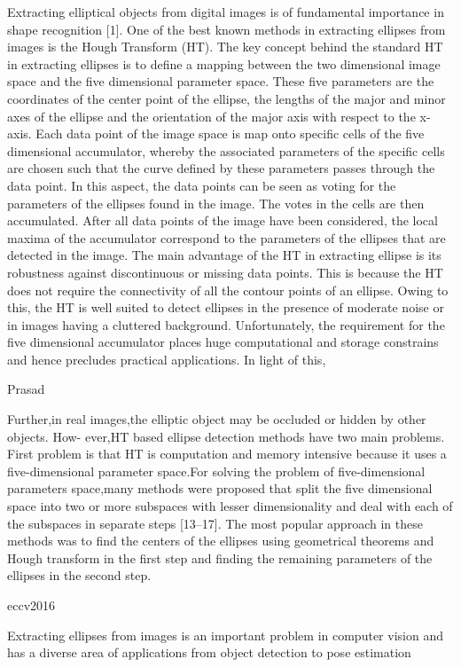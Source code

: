 \documentclass[a4paper]{report}
\begin{document}
Extracting elliptical objects from digital images is of fundamental
importance in shape recognition [1]. One of the best known methods
in extracting ellipses from images is the Hough Transform (HT).
The key concept behind the standard HT in extracting ellipses is to
define a mapping between the two dimensional image space and the
five dimensional parameter space. These five parameters are the coordinates
of the center point of the ellipse, the lengths of the major
and minor axes of the ellipse and the orientation of the major axis
with respect to the x-axis. Each data point of the image space is map
onto specific cells of the five dimensional accumulator, whereby the
associated parameters of the specific cells are chosen such that the
curve defined by these parameters passes through the data point. In
this aspect, the data points can be seen as voting for the parameters
of the ellipses found in the image. The votes in the cells are then accumulated.
After all data points of the image have been considered,
the local maxima of the accumulator correspond to the parameters
of the ellipses that are detected in the image.
The main advantage of the HT in extracting ellipse is its robustness
against discontinuous or missing data points. This is because
the HT does not require the connectivity of all the contour points
of an ellipse. Owing to this, the HT is well suited to detect ellipses
in the presence of moderate noise or in images having a cluttered
background. Unfortunately, the requirement for the five dimensional
accumulator places huge computational and storage constrains and
hence precludes practical applications. In light of this,

Prasad

Further,in real images,the
elliptic object may be occluded or hidden by other objects.
How-
ever,HT based ellipse detection methods have two main problems.
First problem is that HT is computation and memory intensive
because it uses a five-dimensional parameter space.For solving the
problem of five-dimensional parameters space,many methods were
proposed that split the five dimensional space into two or more
subspaces with lesser dimensionality and deal with each of the
subspaces in separate steps [13–17]. The most popular approach in
these methods was to find the centers of the ellipses using
geometrical theorems and Hough transform in the first step and
finding the remaining parameters of the ellipses in the second step.


eccv2016

Extracting ellipses from images is an important problem in computer vision and
has a diverse area of applications from object detection to pose estimation
\end{document}
